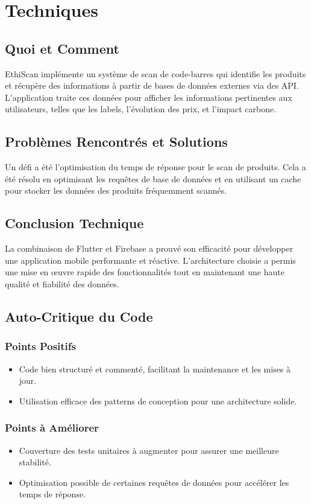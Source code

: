 \section{Techniques}

\subsection{Quoi et Comment}

EthiScan implémente un système de scan de code-barres qui identifie les produits et récupère des informations à partir de bases de données externes via des API. L'application traite ces données pour afficher les informations pertinentes aux utilisateurs, telles que les labels, l'évolution des prix, et l'impact carbone.

\subsection{Problèmes Rencontrés et Solutions}

Un défi a été l'optimisation du temps de réponse pour le scan de produits. Cela a été résolu en optimisant les requêtes de base de données et en utilisant un cache pour stocker les données des produits fréquemment scannés.

\subsection{Conclusion Technique}

La combinaison de Flutter et Firebase a prouvé son efficacité pour développer une application mobile performante et réactive. L'architecture choisie a permis une mise en œuvre rapide des fonctionnalités tout en maintenant une haute qualité et fiabilité des données.

\subsection{Auto-Critique du Code}

\subsubsection{Points Positifs}
\begin{itemize}
    \item Code bien structuré et commenté, facilitant la maintenance et les mises à jour.
    \item Utilisation efficace des patterns de conception pour une architecture solide.
\end{itemize}

\subsubsection{Points à Améliorer}
\begin{itemize}
    \item Couverture des tests unitaires à augmenter pour assurer une meilleure stabilité.
    \item Optimisation possible de certaines requêtes de données pour accélérer les temps de réponse.
\end{itemize}